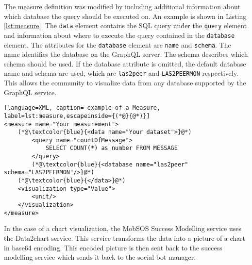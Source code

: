 The measure definition was modified by including additional information about which database the query should be executed on. 
An example is shown in Listing \ref{lst:measure}.
The \texttt{data} element contains the SQL query under the \texttt{query} element and information about where to execute the query contained in the \texttt{database} element.
The attributes for the \texttt{database} element are \texttt{name} and \texttt{schema}. The name identifies the database on the GraphQL server. 
The schema describes which schema should be used.
If the database attribute is omitted, the default database name and schema are used, which are \texttt{las2peer} and \texttt{LAS2PEERMON} respectively.
This allows the community to visualize data from any database supported by the GraphQL service.

\begin{lstlisting}[language=XML, caption= example of a Measure, label=lst:measure,escapeinside={(*@}{@*)}]
<measure name="Your measurement">
    (*@\textcolor{blue}{<data name="Your dataset">}@*)   
        <query name="countOfMessage">
            SELECT COUNT(*) as number FROM MESSAGE
        </query>
        (*@\textcolor{blue}{<database name="las2peer" schema="LAS2PEERMON"/>}@*)
    (*@\textcolor{blue}{</data>}@*)
    <visualization type="Value">
        <unit/>
    </visualization>
</measure>
\end{lstlisting}

In the case of a chart visualization, the MobSOS Success Modelling service uses the Data2chart service. This service transforms the data into a picture of a chart in base64 encoding. This encoded picture is then sent back to the success modelling service which sends it back to the social bot manager.

